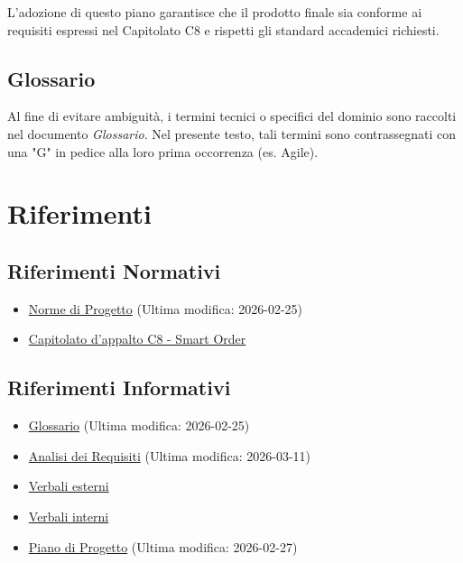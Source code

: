 \documentclass[a4paper,11pt,oneside]{scrartcl}
\begin{document}
L'adozione di questo piano garantisce che il prodotto finale sia conforme ai requisiti espressi nel Capitolato C8 e rispetti gli standard accademici richiesti.

\subsection{Glossario}
Al fine di evitare ambiguità, i termini tecnici o specifici del dominio sono raccolti nel documento \textit{Glossario}.
Nel presente testo, tali termini sono contrassegnati con una "G" in pedice alla loro prima occorrenza (es. Agile{\scriptsize{}}).

\section{Riferimenti}

\subsection{Riferimenti Normativi}
\begin{itemize}
    \item \href{https://github.com/swenightpro/Documentazione/blob/main/docs/RTB/Documentazione%20Interna}{Norme di Progetto} (Ultima modifica: 2026-02-25)
    \item \href{https://www.math.unipd.it/~tullio/IS-1/2025/Progetto/C8.pdf}{Capitolato d'appalto C8 - Smart Order}
\end{itemize}

\subsection{Riferimenti Informativi}
\begin{itemize}
    \item \href{https://github.com/swenightpro/Documentazione/blob/main/docs/RTB/Documentazione%20Esterna}{Glossario} (Ultima modifica: 2026-02-25)
    \item \href{https://github.com/swenightpro/Documentazione/tree/main/docs/RTB/Documentazione%20Esterna}{Analisi dei Requisiti} (Ultima modifica: 2026-03-11)
    \item \href{https://github.com/swenightpro/Documentazione/tree/main/docs/RTB/Documentazione%20Esterna/Verbali%20Esterni}{Verbali esterni}
    \item \href{https://github.com/swenightpro/Documentazione/tree/main/docs/RTB/Documentazione%20Interna/Verbali%20Interni}{Verbali interni}
    \item \href{https://github.com/swenightpro/Documentazione/tree/main/docs/RTB/Documentazione%20Esterna}{Piano di Progetto} (Ultima modifica: 2026-02-27)
\end{itemize}
\end{document}
